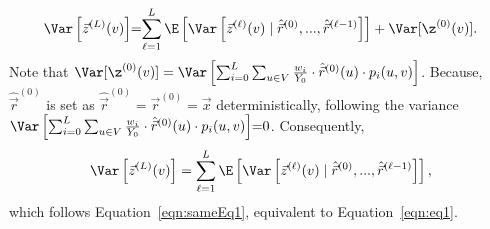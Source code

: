 \begin{equation}\nonumber
\vspace{-2mm}
\Var \left[ \vec{z}^{(L)}(v)\right]
\hspace{-1mm}=\hspace{-1mm}\sum_{\ell=1}^{L}\E \left[\Var \left[\vec{z}^{(\ell)}(v)\mid \hat{\vec{r}}^{(0)},...,\hat{\vec{r}}^{(\ell-1)}\right]\right]+\Var [\z^{(0)}(v)]. 
\end{equation}
Note that $\Var [\z^{(0)}(v)]=\Var\left[ \sum_{i=0}^{L}\sum_{u \in V} \frac{w_i}{Y_{0}} \cdot \hat{\vec{r}}^{(0)}(u)\cdot p_{i}(u,v) \right]$. Because, $\hat{\vec{r}}^{(0)}$ is set as $\hat{\vec{r}}^{(0)}=\vec{r}^{(0)}=\vec{x}$ deterministically, following the variance 
$\Var\left[ \sum_{i=0}^{L}\sum_{u \in V} \frac{w_i}{Y_{0}} \cdot \hat{\vec{r}}^{(0)}(u)\cdot p_{i}(u,v) \right]\hspace{-1mm}=\hspace{-1mm}0$. Consequently, 
\vspace{-3mm}
\begin{equation}\nonumber
\vspace{-2mm}
\Var \left[ \vec{z}^{(L)}(v)\right]=\sum_{\ell=1}^{L}\E \left[\Var \left[\vec{z}^{(\ell)}(v)\mid \hat{\vec{r}}^{(0)},...,\hat{\vec{r}}^{(\ell-1)}\right]\right],     
\end{equation}
which follows Equation~\eqref{eqn:sameEq1}, equivalent to Equation~\eqref{eqn:eq1}. 



